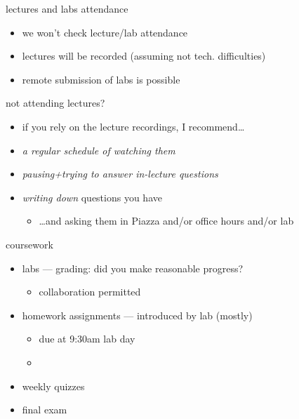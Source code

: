 \begin{frame}{lectures and labs attendance} 
    \begin{itemize}
    \item we won't check lecture/lab attendance
    \vspace{.5cm}
    \item lectures will be recorded (assuming not tech. difficulties)
    \item remote submission of labs is possible
    \end{itemize}
\end{frame}

\begin{frame}{not attending lectures?}
    \begin{itemize}
    \item if you rely on the lecture recordings, I recommend\ldots
    \vspace{.5cm}
    \item \textit{a regular schedule of watching them}
    \item \textit{pausing+trying to answer in-lecture questions}
    \item \textit{writing down} questions you have
    \begin{itemize}
        \item \ldots and asking them in Piazza and/or office hours and/or lab
    \end{itemize}
    \end{itemize}
\end{frame}

\begin{frame}{coursework}
\begin{itemize}
    \item labs --- grading: did you make reasonable progress?
        \begin{itemize}
        \item collaboration permitted
        \end{itemize}
    \item homework assignments --- introduced by lab (mostly)
        \begin{itemize}
        \item due at 9:30am lab day
        \item {}
        \end{itemize}
    \item weekly quizzes
    \item final exam
\end{itemize}
\end{frame}

